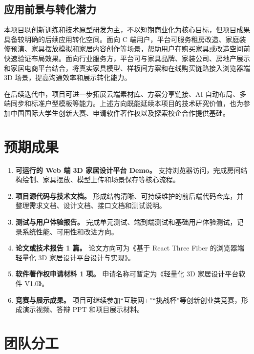 \documentclass[UTF8,fontset=fandol,zihao=-4]{ctexart}
\begin{document}
\subsection{应用前景与转化潜力}

本项目以创新训练和技术原型研发为主，不以短期商业化为核心目标，但项目成果具备较明确的后续应用转化空间。面向 C 端用户，平台可服务租房改造、家庭装修预演、家具摆放模拟和家居内容创作等场景，帮助用户在购买家具或改造空间前快速验证布局效果。面向行业服务方，平台可与家具品牌、家装公司、房地产展示和家居电商平台结合，将真实家具模型、样板间方案和在线购买链路接入浏览器端 3D 场景，提高沟通效率和展示转化能力。

在后续迭代中，项目可进一步拓展云端素材库、方案分享链接、AI 自动布局、多端同步和标准户型模板等能力。上述方向既能延续本项目的技术研究价值，也为参加中国国际大学生创新大赛、申请软件著作权以及探索校企合作提供基础。

\section{预期成果}

\begin{enumerate}
  \item \textbf{可运行的 Web 端 3D 家居设计平台 Demo。} 支持浏览器访问，完成房间结构绘制、家具摆放、模型上传和场景保存等核心流程。
  \item \textbf{项目源代码与技术文档。} 形成结构清晰、可持续维护的前后端代码仓库，并整理需求文档、设计文档、接口文档和测试说明。
  \item \textbf{测试与用户体验报告。} 完成单元测试、端到端测试和基础用户体验测试，记录系统性能、可用性和改进方向。
  \item \textbf{论文或技术报告 1 篇。} 论文方向可为《基于 React Three Fiber 的浏览器端轻量化 3D 家居设计平台设计与实现》。
  \item \textbf{软件著作权申请材料 1 项。} 申请名称可暂定为《轻量化 3D 家居设计平台软件 V1.0》。
  \item \textbf{竞赛与展示成果。} 项目可继续参加“互联网+”“挑战杯”等创新创业类竞赛，形成演示视频、答辩 PPT 和项目展示材料。
\end{enumerate}

\section{团队分工}
\end{document}
